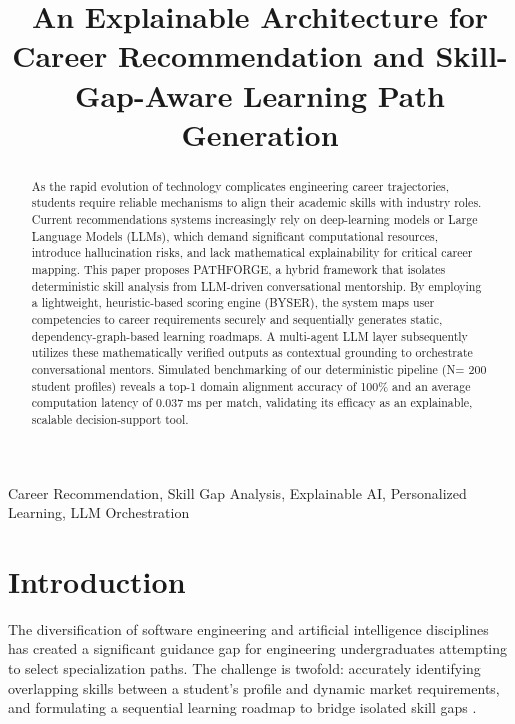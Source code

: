 \documentclass[conference]{IEEEtran}
\begin{document}
\title{An Explainable Architecture for Career Recommendation and Skill-Gap-Aware Learning Path Generation}

\author{
\and
{}
}

\maketitle

\begin{abstract}
As the rapid evolution of technology complicates engineering career trajectories, students require reliable mechanisms to align their academic skills with industry roles. Current recommendations systems increasingly rely on deep-learning models or Large Language Models (LLMs), which demand significant computational resources, introduce hallucination risks, and lack mathematical explainability for critical career mapping. This paper proposes PATHFORGE, a hybrid framework that isolates deterministic skill analysis from LLM-driven conversational mentorship. By employing a lightweight, heuristic-based scoring engine (BYSER), the system maps user competencies to career requirements securely and sequentially generates static, dependency-graph-based learning roadmaps. A multi-agent LLM layer subsequently utilizes these mathematically verified outputs as contextual grounding to orchestrate conversational mentors. Simulated benchmarking of our deterministic pipeline (N= 200 student profiles) reveals a top-1 domain alignment accuracy of 100\% and an average computation latency of 0.037 ms per match, validating its efficacy as an explainable, scalable decision-support tool. 
\end{abstract}

\begin{IEEEkeywords}
Career Recommendation, Skill Gap Analysis, Explainable AI, Personalized Learning, LLM Orchestration
\end{IEEEkeywords}

\section{Introduction}
The diversification of software engineering and artificial intelligence disciplines has created a significant guidance gap for engineering undergraduates attempting to select specialization paths. The challenge is twofold: accurately identifying overlapping skills between a student's profile and dynamic market requirements, and formulating a sequential learning roadmap to bridge isolated skill gaps \cite{prior1, prior2}.
\end{document}
